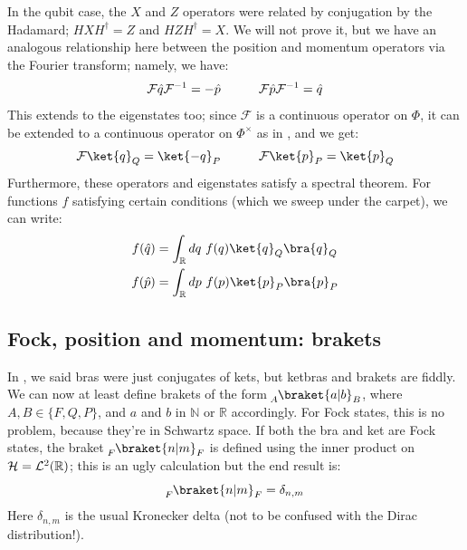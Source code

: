 In the qubit case, the $X$ and $Z$ operators were related by conjugation by the Hadamard; $HXH^\dagger = Z$ and $HZH^\dagger = X$.
We will not prove it, but we have an analogous relationship here between the position and momentum operators via the Fourier transform;
namely, we have:
\begin{equation}
    \mathcal{F} \hat{q} \mathcal{F}^{-1} = -\hat{p}
    \quad\qquad
    \mathcal{F} \hat{p} \mathcal{F}^{-1} = \hat{q}
\end{equation}
This extends to the eigenstates too; since $\mathcal{F}$ is a continuous operator on $\Phi$, it can be extended to a continuous operator on $\Phi^\times$ as in , and we get:
\begin{equation}
    \mathcal{F}\ket{q}_Q = \ket{-q}_P
    \qqquad
    \mathcal{F}\ket{p}_P = \ket{p}_Q
\end{equation}
Furthermore, these operators and eigenstates satisfy a spectral theorem.
For functions $f$ satisfying certain conditions (which we sweep under the carpet), we can write:
\begin{equation}\label{eq:position_momentum_spectral_theorem}
    \begin{aligned}
        f(\hat{q}) &= \int_{\mathbb{R}} dq\ f(q) \ket{q}_Q \bra{q}_Q \\
        f(\hat{p}) &= \int_{\mathbb{R}} dp\ f(p) \ket{p}_P \bra{p}_P
    \end{aligned}
\end{equation}

\subsection{Fock, position and momentum: brakets}

In , we said bras were just conjugates of kets, but ketbras and brakets are fiddly.
We can now at least define brakets of the form $\prepostsub{A}{\braket{a | b}}{B}$, where $A, B \in \{F, Q, P\}$, and $a$ and $b$ in $\mathbb{N}$ or $\mathbb{R}$ accordingly.
For Fock states, this is no problem, because they're in Schwartz space.
If both the bra and ket are Fock states, the braket $\prepostsub{F}{\braket{n | m}}{F}$ is defined using the inner product on $\mathcal{H} = \mathcal{L}^2(\mathbb{R})$; this is an ugly calculation but the end result is:
\begin{equation}
    \prepostsub{F}{\braket{n | m}}{F} = \delta_{n,m}
\end{equation}
Here $\delta_{n,m}$ is the usual Kronecker delta (not to be confused with the Dirac distribution!).

